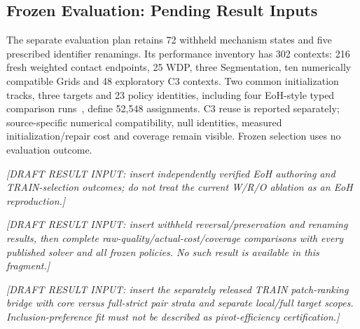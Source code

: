 \subsection{Frozen Evaluation: Pending Result Inputs}
The separate evaluation plan retains 72 withheld mechanism states and five
prescribed identifier renamings. Its performance inventory has 302 contexts:
216 fresh weighted contact endpoints, 25 WDP, three Segmentation, ten
numerically compatible Grids and 48 exploratory C3 contexts. Two common
initialization tracks, three targets and 23 policy identities, including four
EoH-style typed comparison runs~\cite{liu2024eoh}, define 52,548 assignments.
C3 reuse is reported separately; source-specific numerical compatibility,
null identities, measured initialization/repair cost and coverage remain visible.
Frozen selection uses no evaluation outcome.

\textit{[DRAFT RESULT INPUT: insert independently verified EoH authoring and
TRAIN-selection outcomes; do not treat the current W/R/O ablation as an EoH
reproduction.]}

\textit{[DRAFT RESULT INPUT: insert withheld reversal/preservation and
renaming results, then complete raw-quality/actual-cost/coverage comparisons
with every published solver and all frozen policies. No such result is
available in this fragment.]}

\textit{[DRAFT RESULT INPUT: insert the separately released TRAIN patch-ranking
bridge with core versus full-strict pair strata and separate local/full target
scopes. Inclusion-preference fit must not be described as pivot-efficiency
certification.]}
